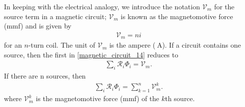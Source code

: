 \documentclass[11pt,a4paper,oneside]{book}
\numberwithin{equation}{section}
\theoremstyle{it}
\theoremstyle{definition}
\begin{document}
In keeping with the electrical analogy, we introduce the notation $\mathscr{V}_m$ for the source term in a magnetic circuit; $\mathscr{V}_m$ is known as the magnetomotive force (mmf) and is given by
\begin{equation}\label{magnetic_circuit_15}
	{\begin{aligned}
			\mathscr{V}_m=ni
	\end{aligned}}
\end{equation} 
for an $n$-turn coil. The unit of $\mathscr{V}_m$ is the ampere ($\SI{}{\ampere}$). If a circuit contains one source, then the first in \ref{magnetic_circuit_14} reduces to 
\begin{equation}\label{magnetic_circuit_16}
	{\begin{aligned}
			\sum_{i}\mathscr{R}_i\Phi_i=\mathscr{V}_m.
	\end{aligned}}
\end{equation} 
If there are n sources, then
\begin{equation}\label{magnetic_circuit_17}
	{\begin{aligned}
			\sum_{i}\mathscr{R}_i\Phi_i=\sum_{k=1}^{n}\mathscr{V}_m^k.
	\end{aligned}}
\end{equation} 
where $\mathscr{V}_m^k$ is the magnetomotive force (mmf) of the $k$th source.
\end{document}
